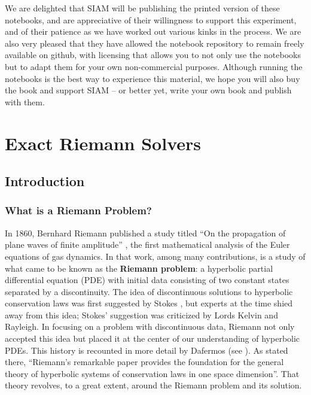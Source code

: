 \documentclass{SIAMbook2016}
\begin{document}
We are delighted that SIAM will be publishing the printed version of
these notebooks, and are appreciative of their willingness to support
this experiment, and of their patience as we have worked out various
kinks in the process. We are also very pleased that they have allowed
the notebook repository to remain freely available on github, with
licensing that allows you to not only use the notebooks but to adapt
them for your own non-commercial purposes. Although running the
notebooks is the best way to experience this material, we hope you will
also buy the book and support SIAM -- or better yet, write your own book
and publish with them.

\part{Exact Riemann Solvers}

\hypertarget{introduction}{%
\chapter{Introduction}\label{introduction}}
\label{sec:01-Introduction}
\hypertarget{what-is-a-riemann-problem}{%
\section{What is a Riemann Problem?}\label{what-is-a-riemann-problem}}

In 1860, Bernhard Riemann published a study titled ``On the propagation
of plane waves of finite amplitude'' \cite{riemann1860fortpflanzung},
the first mathematical analysis of the Euler equations of gas dynamics.
In that work, among many contributions, is a study of what came to be
known as the \textbf{Riemann problem}: a hyperbolic partial differential
equation (PDE) with initial data consisting of two constant states
separated by a discontinuity. The idea of discontinuous solutions to
hyperbolic conservation laws was first suggested by Stokes
\cite{stokes1848liv}, but experts at the time shied away from this idea;
Stokes' suggestion was criticized by Lords Kelvin and Rayleigh. In
focusing on a problem with discontinuous data, Riemann not only accepted
this idea but placed it at the center of our understanding of hyperbolic
PDEs. This history is recounted in more detail by Dafermos (see
\cite{dafermos2010hyperbolic}). As stated there, ``Riemann's remarkable
paper provides the foundation for the general theory of hyperbolic
systems of conservation laws in one space dimension''. That theory
revolves, to a great extent, around the Riemann problem and its
solution.
\end{document}
